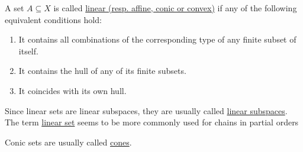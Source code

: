 \begin{definition}\label{def:analysis:basic:combination_sets}
  A set $A \subseteq X$ is called \uline{linear (resp. affine, conic or convex)} if any of the following equivalent conditions hold:

  \begin{enumerate}
    \item It contains all combinations of the corresponding type of any finite subset of itself.
    \item It contains the hull of any of its finite subsets.
    \item It coincides with its own hull.
  \end{enumerate}

  Since linear sets are linear subspaces, they are usually called \uline{linear subspaces}. The term \uline{linear set} seems to be more commonly used for chains in partial orders %

  Conic sets are usually called \uline{cones}.
\end{definition}
